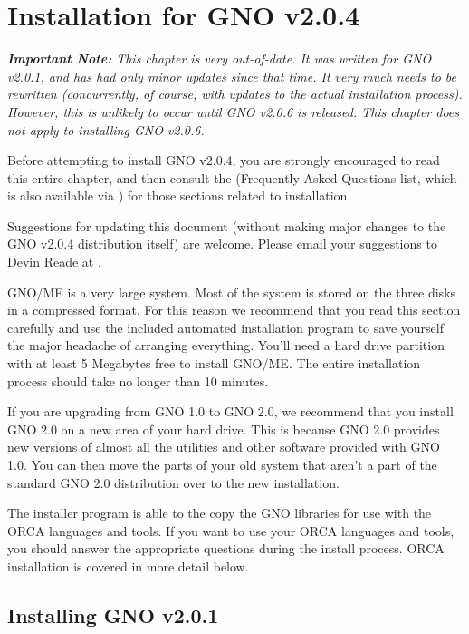 \documentclass{report}
\begin{document}
\chapter{Installation for GNO v2.0.4}

\em 
\textbf{Important Note:}
This chapter is very out-of-date.  It was written for GNO v2.0.1, and
has had only minor updates since that time.  It very much needs to
be rewritten (concurrently, of course, with updates to the actual
installation process).  However, this is unlikely to occur until
GNO v2.0.6 is released.  This chapter does not apply to installing
GNO v2.0.6.

Before attempting to install GNO v2.0.4, you are strongly encouraged to 
read this entire chapter, and then consult the 
 (Frequently Asked Questions list, which is also
available via ) for those sections related to installation.

Suggestions for updating this document (without making major changes
to the GNO v2.0.4 distribution itself) are welcome.  Please email
your suggestions to Devin Reade at .
\rm

GNO/ME is a very large system. Most of the
system is stored on the three disks in a compressed format. For
this reason we recommend that you read this section carefully and
use the included automated installation program to save yourself
the major headache of arranging everything. You'll need a hard
drive partition with at least 5 Megabytes free to install GNO/ME.
The entire installation process should take no longer than 10
minutes. 

If you are upgrading from GNO 1.0 to GNO
2.0, we recommend that you install GNO 2.0 on a new area of your
hard drive. This is because GNO 2.0 provides new versions of
almost all the utilities and other software provided with GNO
1.0. You can then move the parts of your old system that aren't a
part of the standard GNO 2.0 distribution over to the new
installation. 

The installer program is able to the copy
the GNO libraries for use with the ORCA languages and tools. If
you want to use your ORCA languages and tools, you should answer
the appropriate questions during the install process. ORCA
installation is covered in more detail below.

\section{Installing GNO v2.0.1}
\end{document}

